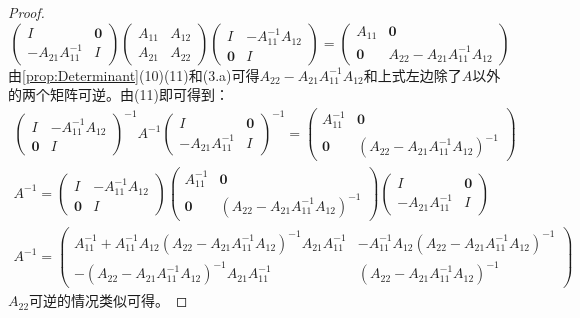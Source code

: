 \begin{proof}
\begin{equation*}
		\begin{pmatrix}
			I & \mathbf{0} \\
			-A_{21}A_{11}^{-1} & I
		\end{pmatrix}
		\begin{pmatrix}
			A_{11} & A_{12} \\
			A_{21} & A_{22}
		\end{pmatrix}
		\begin{pmatrix}
			I & -A_{11}^{-1}A_{12} \\
			\mathbf{0} & I
		\end{pmatrix}=
		\begin{pmatrix}
			A_{11} & \mathbf{0} \\
			\mathbf{0} & A_{22}-A_{21}A_{11}^{-1}A_{12}
		\end{pmatrix}
	\end{equation*}
	由\cref{prop:Determinant}(10)(11)和(3.a)可得$A_{22}-A_{21}A_{11}^{-1}A_{12}$和上式左边除了$A$以外的两个矩阵可逆。由(11)即可得到：
	\begin{gather*}
		\begin{pmatrix}
			I & -A_{11}^{-1}A_{12} \\
			\mathbf{0} & I
		\end{pmatrix}^{-1}A^{-1}
		\begin{pmatrix}
			I & \mathbf{0} \\
			-A_{21}A_{11}^{-1} & I
		\end{pmatrix}^{-1}=
		\begin{pmatrix}
			A_{11}^{-1} & \mathbf{0} \\
			\mathbf{0} & (A_{22}-A_{21}A_{11}^{-1}A_{12})^{-1}
		\end{pmatrix} \\
		A^{-1}=
		\begin{pmatrix}
			I & -A_{11}^{-1}A_{12} \\
			\mathbf{0} & I
		\end{pmatrix}
		\begin{pmatrix}
			A_{11}^{-1} & \mathbf{0} \\
			\mathbf{0} & (A_{22}-A_{21}A_{11}^{-1}A_{12})^{-1}
		\end{pmatrix}
		\begin{pmatrix}
			I & \mathbf{0} \\
			-A_{21}A_{11}^{-1} & I
		\end{pmatrix} \\
		A^{-1}=
		\begin{pmatrix}
			A_{11}^{-1}+A_{11}^{-1}A_{12}(A_{22}-A_{21}A_{11}^{-1}A_{12})^{-1}A_{21}A_{11}^{-1} & -A_{11}^{-1}A_{12}(A_{22}-A_{21}A_{11}^{-1}A_{12})^{-1} \\
			-(A_{22}-A_{21}A_{11}^{-1}A_{12})^{-1}A_{21}A_{11}^{-1} & (A_{22}-A_{21}A_{11}^{-1}A_{12})^{-1}
		\end{pmatrix}
	\end{gather*}
	$A_{22}$可逆的情况类似可得。
\end{proof}

